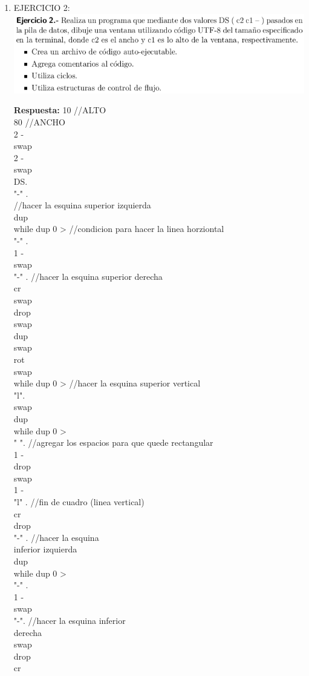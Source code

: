 \documentclass[conference]{IEEEtran}
\begin{document}
\begin{enumerate}
\item  EJERCICIO 2:\\
	\includegraphics{e2} \\
	\begin{center}
	\textbf{Respuesta: } 10 //ALTO \\ 80  //ANCHO \\ 2 - \\ swap \\ 2 - \\ swap \\ DS. \\ "-" . \\ //hacer la esquina superior izquierda \\ dup \\ while dup 0 > //condicion para hacer la linea horziontal \\ "-" . \\  1 - \\ swap \\ "-" . //hacer la esquina superior derecha \\ cr \\ swap \\ drop \\ swap \\ dup \\ swap \\ rot \\ swap \\ while dup 0 > //hacer la esquina superior vertical \\ "l". \\   swap \\   dup \\   while dup 0 > \\ " ". //agregar los espacios para que quede rectangular \\ 1 - \\   drop \\   swap \\   1 - \\   "l" . //fin de cuadro (linea vertical) \\   cr \\ drop \\ "-" . //hacer la esquina \\ inferior izquierda \\ dup \\ while dup 0 > \\  "-" . \\  1 - \\ swap \\ "-". //hacer la esquina inferior \\ derecha \\ swap \\ drop \\ cr \\

\end{center}
\end{enumerate}
\end{document}
